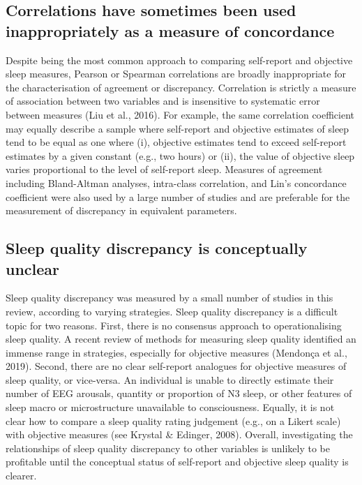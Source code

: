 \documentclass[
]{article}
\begin{document}
\subsection{Correlations have sometimes been used inappropriately as a measure of concordance}\label{correlations-have-sometimes-been-used-inappropriately-as-a-measure-of-concordance}

Despite being the most common approach to comparing self-report and objective sleep measures, Pearson or Spearman correlations are broadly inappropriate for the characterisation of agreement or discrepancy. Correlation is strictly a measure of association between two variables and is insensitive to systematic error between measures (Liu et al., 2016). For example, the same correlation coefficient may equally describe a sample where self-report and objective estimates of sleep tend to be equal as one where (i), objective estimates tend to exceed self-report estimates by a given constant (e.g., two hours) or (ii), the value of objective sleep varies proportional to the level of self-report sleep. Measures of agreement including Bland-Altman analyses, intra-class correlation, and Lin's concordance coefficient were also used by a large number of studies and are preferable for the measurement of discrepancy in equivalent parameters.

\subsection{Sleep quality discrepancy is conceptually unclear}\label{sleep-quality-discrepancy-is-conceptually-unclear}

Sleep quality discrepancy was measured by a small number of studies in this review, according to varying strategies. Sleep quality discrepancy is a difficult topic for two reasons. First, there is no consensus approach to operationalising sleep quality. A recent review of methods for measuring sleep quality identified an immense range in strategies, especially for objective measures (Mendonça et al., 2019). Second, there are no clear self-report analogues for objective measures of sleep quality, or vice-versa. An individual is unable to directly estimate their number of EEG arousals, quantity or proportion of N3 sleep, or other features of sleep macro or microstructure unavailable to consciousness. Equally, it is not clear how to compare a sleep quality rating judgement (e.g., on a Likert scale) with objective measures (see Krystal \& Edinger, 2008). Overall, investigating the relationships of sleep quality discrepancy to other variables is unlikely to be profitable until the conceptual status of self-report and objective sleep quality is clearer.
\end{document}
